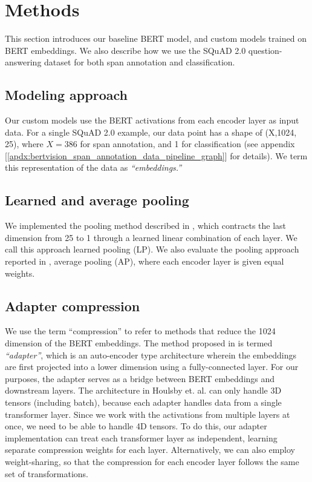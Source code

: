 \section{Methods}
\label{sec:methods}

This section introduces our baseline BERT model, and custom models trained on BERT embeddings. We also describe how we use the SQuAD 2.0 question-answering dataset for both span annotation and classification.

\subsection{Modeling approach}

Our custom models use the BERT activations from each encoder layer as input data. For a single SQuAD 2.0 example, our data point has a shape of (X,1024, 25), where $X=386$ for span annotation, and 1 for classification (see appendix [\ref{apdx:bertvision_span_annotation_data_pipeline_graph}] for details). We term this representation of the data as \textit{“embeddings.”}

\subsection{Learned and average pooling}

We implemented the pooling method described in \cite{tenney-etal-2019-bert}, which contracts the last dimension from 25 to 1 through a learned linear combination of each layer. We call this approach learned pooling (LP). We also evaluate the pooling approach reported in \cite{ma2019universal}, average pooling (AP), where each encoder layer is given equal weights. 

\subsection{Adapter compression}

We use the term “compression” to refer to methods that reduce the 1024 dimension of the BERT embeddings. The method proposed in \cite{DBLP:journals/corr/abs-1902-00751} is termed \textit{“adapter”}, which is an auto-encoder type architecture wherein the embeddings are first projected into a lower dimension using a fully-connected layer. For our purposes, the adapter serves as a bridge between BERT embeddings and downstream layers. The architecture in Houlsby et. al. can only handle 3D tensors (including batch), because each adapter handles data from a single transformer layer. Since we work with the activations from multiple layers at once, we need to be able to handle 4D tensors. To do this, our adapter implementation can treat each transformer layer as independent, learning separate compression weights for each layer. Alternatively, we can also employ weight-sharing, so that the compression for each encoder layer follows the same set of transformations.

